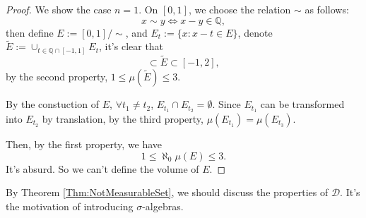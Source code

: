 \begin{proof}
    We show the case $n=1$. 
    On $[0,1]$, we choose the relation $\sim$ as follows:
    \begin{displaymath}
        x\sim y\Leftrightarrow x-y\in\mathbb{Q},
    \end{displaymath}
    then define $E:=[0,1]/\sim$, and $E_{t}:=\{x:x-t\in E\}$, 
    denote $\tilde{E}:=\cup_{t\in\mathbb{Q}\cap[-1,1]}E_{t}$, 
    it's clear that 
    \begin{displaymath}
        [0,1]\subset\tilde{E}\subset[-1,2],
    \end{displaymath}
    by the second property, $1\le\mu(\tilde{E})\le 3$.

    By the constuction of $E$, $\forall t_{1}\neq t_2$, 
    $E_{t_1}\cap E_{t_2}=\emptyset$. 
    Since $E_{t_1}$ can be transformed into $E_{t_2}$ by translation, 
    by the third property, $\mu(E_{t_1})=\mu(E_{t_3})$.

    Then, by the first property, we have 
    \begin{displaymath}
        1\le\aleph_{0}\mu(E)\le 3.
    \end{displaymath}
    It's absurd. So we can't define the volume of $E$.
\end{proof}
\begin{rem}
    By Theorem \ref{Thm:NotMeasurableSet}, 
    we should discuss the properties of $\mathcal{D}$. 
    It's the motivation of introducing 
    $\sigma$-algebras.
\end{rem}
